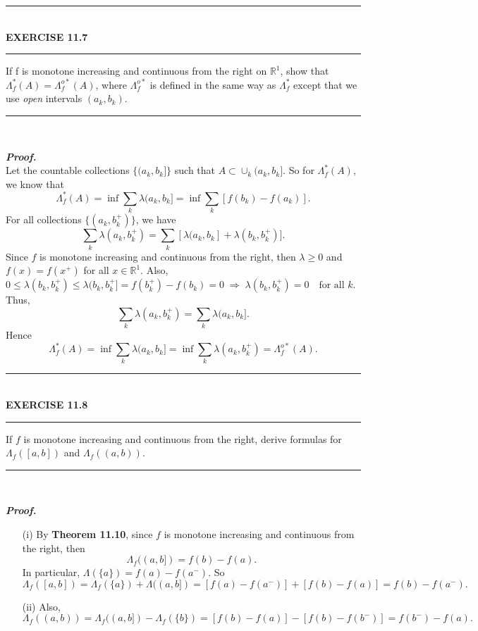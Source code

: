 \documentclass[a4paper,11pt]{article}
\begin{document}
	\begin{flushleft}
		\rule[-0.5ex]{17cm}{2pt}\\
			\textbf{EXERCISE 11.7}\\
		\rule[1.5ex]{17cm}{0.5pt}
			If f is monotone increasing and continuous from the right on $\mathbb{R}^1$, show that $\Lambda_f^*(A)=\Lambda_f^{o*}(A)$, where $\Lambda_f^{o*}$ is defined in the same way as $\Lambda_f^*$ except that we use \textit{open} intervals $(a_k,b_k)$.
		\rule[1.0ex]{17cm}{0.5pt}\
	\end{flushleft}
	\textbf{\textit{Proof.}}\\
		Let the countable collections $\{(a_k,b_k]\}$ such that $A \subset \cup_k (a_k,b_k]$. So for $\Lambda_f^*(A)$, we know that
			$$\Lambda_f^*(A)
			= \inf \sum_k \lambda(a_k,b_k]
			= \inf \sum_k [f(b_k) - f(a_k)].$$
		For all collections $\{(a_k,b_k^+)\}$, we have
			$$\sum_k \lambda(a_k,b_k^+)
			= \sum_k [\lambda(a_k,b_k] + \lambda(b_k,b_k^+)].$$
		Since $f$ is monotone increasing and continuous from the right, then $\lambda \geq 0$ and $f(x) = f(x^+)$ for all $x \in \mathbb{R}^1$. Also, $0 \leq \lambda(b_k,b_k^+) \leq \lambda(b_k,b_k^+] = f(b_k^+) - f(b_k) = 0 \;\Rightarrow \;\lambda(b_k,b_k^+) = 0 \quad \text{for all }k$. Thus,
			$$\sum_k \lambda(a_k,b_k^+)
			= \sum_k \lambda(a_k,b_k].$$
		Hence
			$$\Lambda_f^*(A)
			= \inf \sum_k \lambda(a_k,b_k]
			= \inf \sum_k \lambda(a_k,b_k^+)
			= \Lambda^{o*}_f (A).$$

	\begin{flushleft}
		\rule[-0.5ex]{17cm}{2pt}\\
			\textbf{EXERCISE 11.8}\\
		\rule[1.5ex]{17cm}{0.5pt}
			If $f$ is monotone increasing and continuous from the right, derive formulas for $\Lambda_f([a,b])$ and $\Lambda_f((a,b))$.
		\rule[1.0ex]{17cm}{0.5pt}\
	\end{flushleft}
	\textbf{\textit{Proof.}}
	\begin{enumerate}
		\item[(i)] By \textbf{Theorem 11.10}, since $f$ is monotone increasing and continuous from the right, then
			$$\Lambda_f((a,b]) = f(b) - f(a).$$
		In particular, $\Lambda(\{a\}) = f(a) - f(a^-)$. So
			$$\Lambda_f([a,b])
			= \Lambda_f(\{a\}) + \Lambda((a,b])
			= [f(a) - f(a^-)] + [f(b) - f(a)]
			= f(b) - f(a^-).$$

		\item[(ii)]
			Also,
				$$\Lambda_f((a,b))
				= \Lambda_f((a,b]) - \Lambda_f(\{b\})
				= [f(b) - f(a)] - [f(b) - f(b^-)]
				= f(b^-) - f(a).$$
	\end{enumerate}
\end{document}
